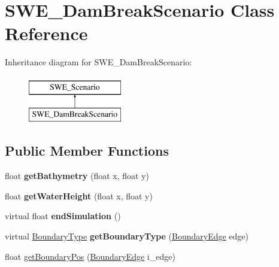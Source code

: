 \hypertarget{classSWE__DamBreakScenario}{\section{S\-W\-E\-\_\-\-Dam\-Break\-Scenario Class Reference}
\label{classSWE__DamBreakScenario}
}
Inheritance diagram for S\-W\-E\-\_\-\-Dam\-Break\-Scenario\-:\begin{figure}[H]
\begin{center}
\leavevmode
\includegraphics[height=2.000000cm]{classSWE__DamBreakScenario}
\end{center}
\end{figure}
\subsection*{Public Member Functions}
\begin{DoxyCompactItemize}
\item 
\hypertarget{classSWE__DamBreakScenario_a93ffd9497ad621b1f9d978f9ff288b0e}{float {\bfseries get\-Bathymetry} (float x, float y)}\label{classSWE__DamBreakScenario_a93ffd9497ad621b1f9d978f9ff288b0e}

\item 
\hypertarget{classSWE__DamBreakScenario_a482c5f6e49f669baee422a6138622315}{float {\bfseries get\-Water\-Height} (float x, float y)}\label{classSWE__DamBreakScenario_a482c5f6e49f669baee422a6138622315}

\item 
\hypertarget{classSWE__DamBreakScenario_a325df5b07edd81a699a71d58916890ac}{virtual float {\bfseries end\-Simulation} ()}\label{classSWE__DamBreakScenario_a325df5b07edd81a699a71d58916890ac}

\item 
\hypertarget{classSWE__DamBreakScenario_a5919566875916c9abd3003962bbabcdd}{virtual \hyperlink{SWE__Scenario_8hh_af75d5dd7322fa39ed0af4e7839e600f8}{Boundary\-Type} {\bfseries get\-Boundary\-Type} (\hyperlink{SWE__Scenario_8hh_aa5e01e3f7df312f7b9b0d02521141fcc}{Boundary\-Edge} edge)}\label{classSWE__DamBreakScenario_a5919566875916c9abd3003962bbabcdd}

\item 
float \hyperlink{classSWE__DamBreakScenario_aae5290289aa810726d12d4e09b9716fc}{get\-Boundary\-Pos} (\hyperlink{SWE__Scenario_8hh_aa5e01e3f7df312f7b9b0d02521141fcc}{Boundary\-Edge} i\-\_\-edge)
\end{DoxyCompactItemize}



